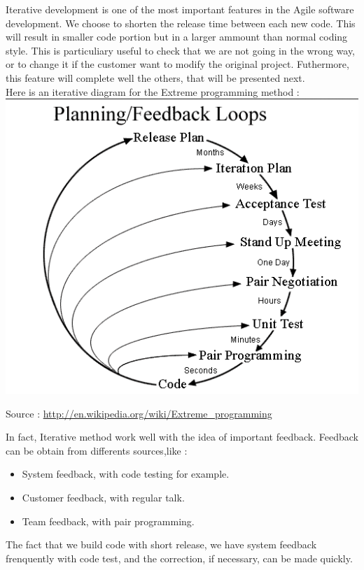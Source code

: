 \documentclass[french,english,12pt]{article}
\begin{document}
Iterative development is one of the most important features in the Agile software development. We choose to shorten the release time between each new code. This will result in smaller code portion but in a larger ammount than normal coding style. This is particuliary useful to check that we are not going in the wrong way, or to change it if the customer want to modify the original project. Futhermore, this feature will complete well the others, that will be presented next.\\

Here is an iterative diagram for the Extreme programming method :\\

\includegraphics[scale=0.40]{Extrem_Diagram.png} 

Source : \url{http://en.wikipedia.org/wiki/Extreme_programming}

In fact, Iterative method work well with the idea of important feedback. Feedback can be obtain from differents sources,like :\\
\begin{itemize}
\item System feedback, with code testing for example.
\item Customer feedback, with regular talk.
\item Team feedback, with pair programming.
\end{itemize}

The fact that we build code with short release, we have system feedback frenquently with code test, and the correction, if necessary, can be made quickly.
\end{document}
